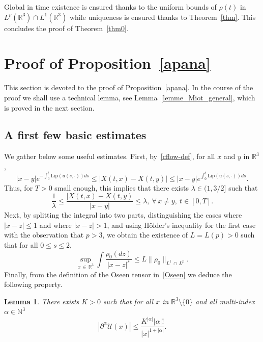 \documentclass[10pt]{amsart}
\newtheorem{lemm}[theo]{Lemma}\newtheorem{prop}[theo]{Proposition}\newtheorem{coro}[theo]{Corollary}\newtheorem{conj}[theo]{Conjecture}
\theoremstyle{definition}\newtheorem{defi}[theo]{Definition}\newtheorem{rema}[theo]{Remark}\newtheorem{exam}[theo]{Example}\newtheorem{exem}[theo]{Example}\newtheorem{nota}[theo]{Notation}
\newcommand{\Lip}{\mathrm{Lip}}
\newcommand{\R}{\mathbb{R}}
\newcommand{\N}{\mathbb{N}}
\newcommand{\clU}{\mathcal{U}}
\renewcommand{\leq}{\leqslant}
\let\oldforall\forall
\renewcommand*{\forall}{\mathrel{\oldforall}}
\begin{document}
Global in time existence is ensured thanks to the uniform bounds of $\rho(t)$ in $L^p(\R^3) \cap L^1(\R^3)$ while uniqueness is ensured thanks to Theorem~\ref{thm}. This concludes the proof of Theorem~\ref{thm0}.

\section{Proof of Proposition~\ref{apana}}\label{sec-apana}

This section is devoted to the proof of Proposition~\ref{apana}. In the course of the proof we shall use a technical lemma, see Lemma~\ref{lemme_Miot_general}, which is proved in the next section.

\subsection{A first few basic estimates} We gather below some useful estimates. First, by~\eqref{cflow-def}, for all $x$ and $y$ in $\R^3$,
\begin{equation}\label{coince}
|x-y|e^{\displaystyle -\int_0^t \Lip(u(s,\cdot))ds}\leq |X(t,x)-X(t,y)| \leq |x-y| e^{\displaystyle \int_0^t \Lip(u(s,\cdot))ds}.
\end{equation}
Thus, for $T>0$ small enough, this implies that there exists $\lambda \in (1,3/2]$ such that
\begin{equation}\label{aveclambda}
\frac{1}{\lambda} \leq \frac{|X(t,x)-X(t,y)}{|x-y|} \leq \lambda,\: \forall \, x \neq y,\: t\in[0,T].
\end{equation}
Next, by splitting the integral into two parts, distinguishing the cases where $|x-z|\leq 1$ and where $|x-z|> 1$, and using H\"older's inequality for the first case with the observation that $p>3$, we obtain the existence of $L=L(p)>0$ such that for all $0\leq s\leq 2$,
\begin{equation}\label{fors}
\underset{x\,\in\,\R^3}{\sup} \int \frac{\rho_0(dz)}{|x-z|^s} \leq L \|\rho_0\|_{L^1\,\cap\,L^p}.
\end{equation}
Finally, from the definition of the Oseen tensor in~\eqref{Oseen} we deduce the following property.

\begin{lemm}\label{lemme_oseen_rec}
There exists $K>0$ such that for all $x$ in $\R^3\setminus \{0\}$ and all multi-index $\alpha \in \N^3$
\begin{equation}\label{alpha-U}
\left|\partial^\alpha \clU(x)\right| \leq \frac{K^{|\alpha|} |\alpha|!}{|x|^{1+|\alpha|}}.
\end{equation}
\end{lemm}
\end{document}
